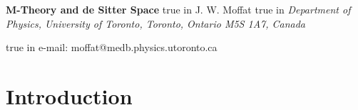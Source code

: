 \documentclass[a4paper,12pt]{article}
\begin{document}
\begin{center}
{\large\bf M-Theory and de Sitter Space}
 true in
{\large J. W. Moffat}
 true in
{\it Department of Physics, University of Toronto,
Toronto, Ontario M5S 1A7, Canada}
\end{center}
\begin{abstract}%
An M-theory constructed in an eleven-dimensional supermanifold with
a \myHighlight{$\diamondsuit$}\coordHE{}-product of field operators is shown to have a de Sitter
space solution. Possible implications of this result for cosmology are
mentioned.
\end{abstract}
 true in e-mail:
moffat@medb.physics.utoronto.ca


\section{Introduction}
\end{document}
